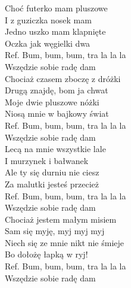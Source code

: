 
Choć futerko mam pluszowe \tab{} \\
I z guziczka nosek mam \tab{} \\
Jedno uszko mam klapnięte \tab{}  \\
Oczka jak węgielki dwa \tab{}\\
\hops
Ref. Bum, bum, bum, tra la la la \\
 Wszędzie sobie radę dam \tab{} \\
\hops
Chociaż czasem zboczę z dróżki \\
Drugą znajdę, bom ja chwat \\
Moje dwie pluszowe nóżki \\
Niosą mnie w bajkowy świat \\
\hops
Ref. Bum, bum, bum, tra la la la \\
 Wszędzie sobie radę dam \\
\hops
Lecą na mnie wszystkie lale \\
I murzynek i bałwanek \\
Ale ty się durniu nie ciesz \\
Za malutki jesteś przecież \\
\hops
Ref. Bum, bum, bum, tra la la la \\
 Wszędzie sobie radę dam \\
\hops
Chociaż jestem małym misiem \\
Sam się myję, myj myj myj \\
Niech się ze mnie nikt nie śmieje \\
Bo dołożę łapką w ryj! \\
\hops
Ref. Bum, bum, bum, tra la la la \\
 Wszędzie sobie radę dam 